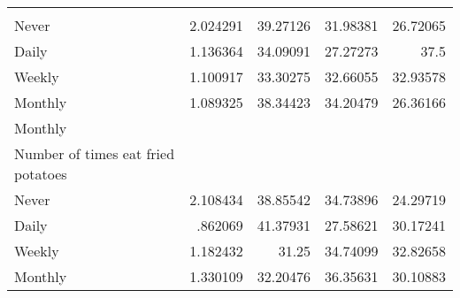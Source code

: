 \documentclass{article}
\begin{document}
\begin{tabular}{lllll}
  \multicolumn{1}{|r}{} &
  \multicolumn{1}{r}{} &
  \multicolumn{1}{r}{} &
  \multicolumn{1}{r}{} \\
\multicolumn{1}{l}{\hspace{5em}Never} &
  \multicolumn{1}{|r}{2.024291} &
  \multicolumn{1}{r}{39.27126} &
  \multicolumn{1}{r}{31.98381} &
  \multicolumn{1}{r}{26.72065} \\
\multicolumn{1}{l}{\hspace{5em}Daily} &
  \multicolumn{1}{|r}{1.136364} &
  \multicolumn{1}{r}{34.09091} &
  \multicolumn{1}{r}{27.27273} &
  \multicolumn{1}{r}{37.5} \\
\multicolumn{1}{l}{\hspace{5em}Weekly} &
  \multicolumn{1}{|r}{1.100917} &
  \multicolumn{1}{r}{33.30275} &
  \multicolumn{1}{r}{32.66055} &
  \multicolumn{1}{r}{32.93578} \\
\multicolumn{1}{l}{\hspace{5em}Monthly} &
  \multicolumn{1}{|r}{1.089325} &
  \multicolumn{1}{r}{38.34423} &
  \multicolumn{1}{r}{34.20479} &
  \multicolumn{1}{r}{26.36166} \\
\multicolumn{1}{l}{\hspace{3em}Monthly} &
  \multicolumn{1}{|r}{} &
  \multicolumn{1}{r}{} &
  \multicolumn{1}{r}{} &
  \multicolumn{1}{r}{} \\
\multicolumn{1}{l}{\hspace{4em}Number of times eat fried potatoes} &
  \multicolumn{1}{|r}{} &
  \multicolumn{1}{r}{} &
  \multicolumn{1}{r}{} &
  \multicolumn{1}{r}{} \\
\multicolumn{1}{l}{\hspace{5em}Never} &
  \multicolumn{1}{|r}{2.108434} &
  \multicolumn{1}{r}{38.85542} &
  \multicolumn{1}{r}{34.73896} &
  \multicolumn{1}{r}{24.29719} \\
\multicolumn{1}{l}{\hspace{5em}Daily} &
  \multicolumn{1}{|r}{.862069} &
  \multicolumn{1}{r}{41.37931} &
  \multicolumn{1}{r}{27.58621} &
  \multicolumn{1}{r}{30.17241} \\
\multicolumn{1}{l}{\hspace{5em}Weekly} &
  \multicolumn{1}{|r}{1.182432} &
  \multicolumn{1}{r}{31.25} &
  \multicolumn{1}{r}{34.74099} &
  \multicolumn{1}{r}{32.82658} \\
\multicolumn{1}{l}{\hspace{5em}Monthly} &
  \multicolumn{1}{|r}{1.330109} &
  \multicolumn{1}{r}{32.20476} &
  \multicolumn{1}{r}{36.35631} &
  \multicolumn{1}{r}{30.10883} \\

\end{tabular}
\end{document}
